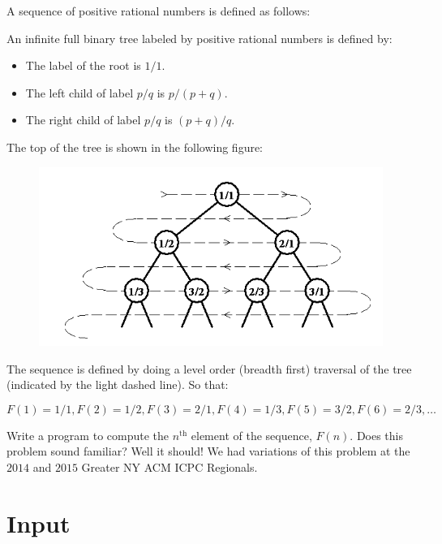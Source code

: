 
A sequence of positive rational numbers is defined as follows:

An infinite full binary tree labeled by positive rational numbers is defined by:
\begin{itemize}
\item The label of the root is $1/1$.
\item The left child of label $p/q$ is $p/(p+q)$.
\item The right child of label $p/q$ is $(p+q)/q$.
\end{itemize}

The top of the tree is shown in the following figure:

\begin{figure}[!h]
    \begin{center}
        \includegraphics[]{f1.png} \\
    \end{center}
\end{figure}

The sequence is defined by doing a level order (breadth first) traversal of
the tree (indicated by the light dashed line). So that:

\[
F(1) = 1/1, F(2) = 1/2, F(3) = 2/1, F(4) = 1/3, F(5) = 3/2, F(6) = 2/3, \ldots
\]

Write a program to compute the $n^{\text{th}}$ element of the sequence, $F(n)$. Does this problem sound
familiar? Well it should! We had variations of this problem at the $2014$ and $2015$ 
Greater NY ACM ICPC Regionals.

\section*{Input}

